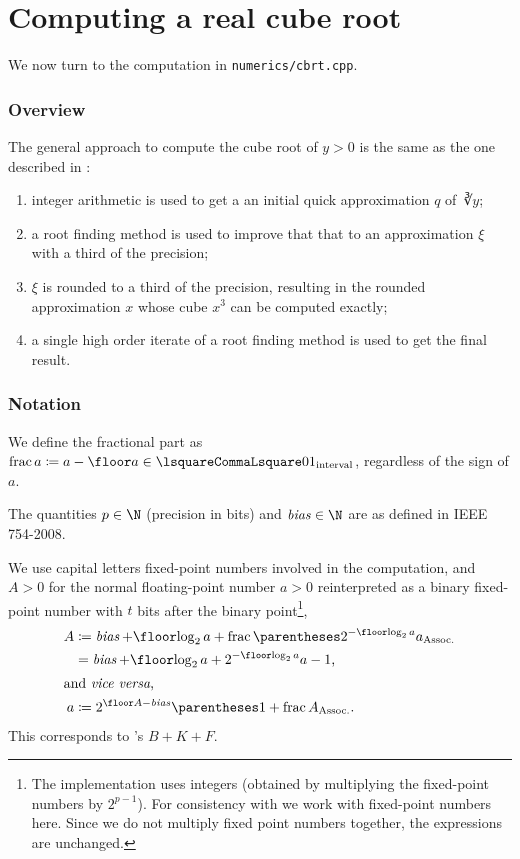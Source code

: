 ﻿\documentclass[10pt, a4paper, twoside]{basestyle}
\DeclareMathOperator{\bias}{\mathit{bias}}
\begin{document}
\part*{Computing a real cube root}

We now turn to the computation in \texttt{numerics/cbrt.cpp}.

\section*{Overview}
The general approach to compute the cube root of $y>0$ is the same as the one described in \cite{KahanBindel2001}:
\begin{enumerate}
\item integer arithmetic is used to get a an initial quick approximation $q$ of $\cuberoot y$;
\item a root finding method is used to improve that that to an approximation $ξ$ with a third of the precision;
\item $ξ$ is rounded to a third of the precision, resulting in the rounded approximation $x$ whose cube $x^3$ can be computed exactly;
\item a single high order iterate of a root finding method is used to get the final result.
\end{enumerate}

\section*{Notation}
We define the fractional part as $\FractionalPart a\DefineAs a-\Floor a\in\intclop{0}{1}$, regardless of the sign of $a$.

The quantities $p\in\N$ (precision in bits) and $\bias\in\N$ are as defined in IEEE 754-2008. 

We use capital letters fixed-point numbers involved in the computation, and $A>0$ for the normal floating-point number $a>0$ reinterpreted as a binary fixed-point number with $t$ bits after the binary point\footnote{The implementation uses integers (obtained by multiplying the fixed-point numbers by $2^{p-1}$). For consistency with \cite{KahanBindel2001} we work with fixed-point numbers here. Since we do not multiply fixed point numbers together, the expressions are unchanged.},\begin{align*}
  A &\DefineAs \bias + \Floor{\log_2 a} + \FractionalPart \pa{2^{-\Floor{\log_2 a}}a}\\
    &= \bias + \Floor{\log_2 a} + 2^{-\Floor{\log_2 a}}a - 1\text,\\
\intertext{and \emph{vice versa},}
  a &\DefineAs 2^{\Floor A-\bias} \pa{1+\FractionalPart{A}}\text.\\
\end{align*}
This corresponds to \cite{KahanBindel2001}'s $B+K+F$.
\end{document}

